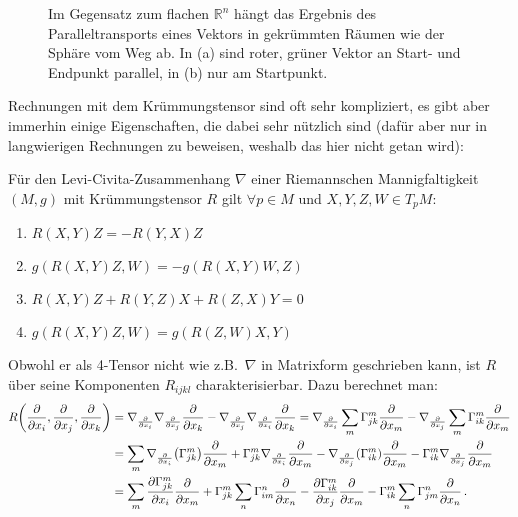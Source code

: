 \begin{figure}
\centering

\hspace{0.06\textwidth}%

\caption[Paralleltransport]{Im Gegensatz zum flachen $\mathbb{R}^n$ hängt das Ergebnis des Paralleltransports eines Vektors in gekrümmten Räumen wie der Sphäre vom Weg ab. In (a) sind roter, grüner Vektor an Start- und Endpunkt parallel, in (b) nur am Startpunkt.}
\label{fig:paralleltransport}
\end{figure}


Rechnungen mit dem Krümmungstensor sind oft sehr kompliziert, es gibt aber immerhin einige Eigenschaften, die dabei sehr nützlich sind (dafür aber nur in langwierigen Rechnungen zu beweisen, weshalb das hier nicht getan wird):

\begin{satz}
Für den Levi-Civita-Zusammenhang $\nabla$ einer Riemannschen Mannigfaltigkeit $(M, g)$ mit Krümmungstensor $R$ gilt $\forall p \in M$ und $X, Y, Z, W \in T_p M$:
\begin{enumerate}
\item $R(X, Y) Z = - R(Y, X) Z$

\item $g(R(X, Y) Z, W) = - g(R(X, Y) W, Z)$

\item $R(X, Y) Z + R(Y, Z) X + R(Z, X) Y = 0$

\item $g(R(X, Y) Z, W) = g(R(Z, W) X, Y)$
\end{enumerate}
\end{satz}

Obwohl er als 4-Tensor nicht wie z.B.~$\nabla$ in Matrixform geschrieben kann, ist $R$ über seine Komponenten $R_{ijkl}$ charakterisierbar. Dazu berechnet man:
\begin{align*}
R\qty(\pdv{x_i}, \pdv{x_j}, \pdv{x_k}) &= \nabla_{\pdv{x_i}} \nabla_{\pdv{x_j}} \pdv{x_k} - \nabla_{\pdv{x_j}} \nabla_{\pdv{x_i}} \pdv{x_k} = \nabla_{\pdv{x_i}} \sum_m \Gamma_{jk}^m \pdv{x_m} - \nabla_{\pdv{x_j}} \sum_m \Gamma_{ik}^m \pdv{x_m}
\\
&= \sum_m \nabla_{\pdv{x_i}} \qty(\Gamma_{jk}^m) \pdv{x_m} + \Gamma_{jk}^m \nabla_{\pdv{x_i}} \pdv{x_m} - \nabla_{\pdv{x_j}} \qty(\Gamma_{ik}^m) \pdv{x_m} - \Gamma_{ik}^m \nabla_{\pdv{x_j}} \pdv{x_m}
\\
&= \sum_m \pdv{\Gamma_{jk}^m}{x_i} \pdv{x_m} + \Gamma_{jk}^m \sum_n \Gamma_{im}^n \pdv{x_n} - \pdv{\Gamma_{ik}^m}{x_j} \pdv{x_m} - \Gamma_{ik}^m  \sum_n \Gamma_{jm}^n \pdv{x_n} \, .
\end{align*}

